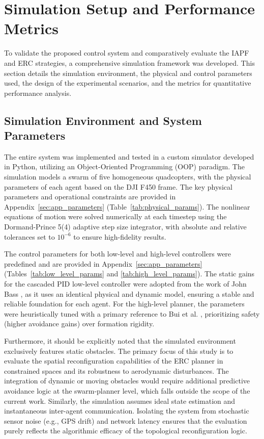 \documentclass[pdflatex,sn-basic]{sn-jnl}%
\begin{document}
\section{Simulation Setup and Performance Metrics}
    To validate the proposed control system and comparatively evaluate the IAPF and ERC strategies, a comprehensive simulation framework was developed. This section details the simulation environment, the physical and control parameters used, the design of the experimental scenarios, and the metrics for quantitative performance analysis.

    \subsection{Simulation Environment and System Parameters}
        The entire system was implemented and tested in a custom simulator developed in Python, utilizing an Object-Oriented Programming (OOP) paradigm. The simulation models a swarm of five homogeneous quadcopters, with the physical parameters of each agent based on the DJI F450 frame. The key physical parameters and operational constraints are provided in Appendix~\ref{sec:app_parameters} (Table~\ref{tab:physical_params}). The nonlinear equations of motion were solved numerically at each timestep using the Dormand-Prince 5(4) adaptive step size integrator, with absolute and relative tolerances set to $10^{-6}$ to ensure high-fidelity results.

        The control parameters for both low-level and high-level controllers were predefined and are provided in Appendix~\ref{sec:app_parameters} (Tables~\ref{tab:low_level_params} and \ref{tab:high_level_params}). The static gains for the cascaded PID low-level controller were adopted from the work of John Bass \citep{john_bobzwikquadcopter_simcon_2025}, as it uses an identical physical and dynamic model, ensuring a stable and reliable foundation for each agent. For the high-level planner, the parameters were heuristically tuned with a primary reference to Bui et al. \citep{bui_event-based_2025}, prioritizing safety (higher avoidance gains) over formation rigidity.

        Furthermore, it should be explicitly noted that the simulated environment exclusively features static obstacles. The primary focus of this study is to evaluate the spatial reconfiguration capabilities of the ERC planner in constrained spaces and its robustness to aerodynamic disturbances. The integration of dynamic or moving obstacles would require additional predictive avoidance logic at the swarm-planner level, which falls outside the scope of the current work. Similarly, the simulation assumes ideal state estimation and instantaneous inter-agent communication. Isolating the system from stochastic sensor noise (e.g., GPS drift) and network latency ensures that the evaluation purely reflects the algorithmic efficacy of the topological reconfiguration logic.
\end{document}
